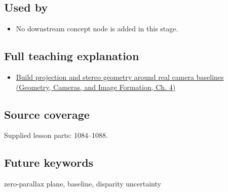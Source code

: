 \subsection{Used by}\label{appendix-0976e86e5b9f-used-by}

\hypertarget{appendix-0976e86e5b9f-used-by}{}

\begin{itemize}
\tightlist
\item
  No downstream concept node is added in this stage.
\end{itemize}

\subsection{Full teaching explanation}\label{appendix-0976e86e5b9f-full-teaching-explanation}

\hypertarget{appendix-0976e86e5b9f-full-teaching-explanation}{}

\begin{itemize}
\tightlist
\item
  \href{../03-Geometry-Cameras-and-Image-Formation/main.pdf\#nameddest=02-foundations-ii-ch035-build-projection-and-stereo-geometry-around-real-camera-baselines}{Build projection and stereo geometry around real camera baselines (Geometry, Cameras, and Image Formation, Ch. 4)}
\end{itemize}

\subsection{Source coverage}\label{appendix-0976e86e5b9f-source-coverage}

\hypertarget{appendix-0976e86e5b9f-source-coverage}{}

Supplied lesson parts: 1084--1088.

\subsection{Future keywords}\label{appendix-0976e86e5b9f-future-keywords}

\hypertarget{appendix-0976e86e5b9f-future-keywords}{}

zero-parallax plane, baseline, disparity uncertainty
